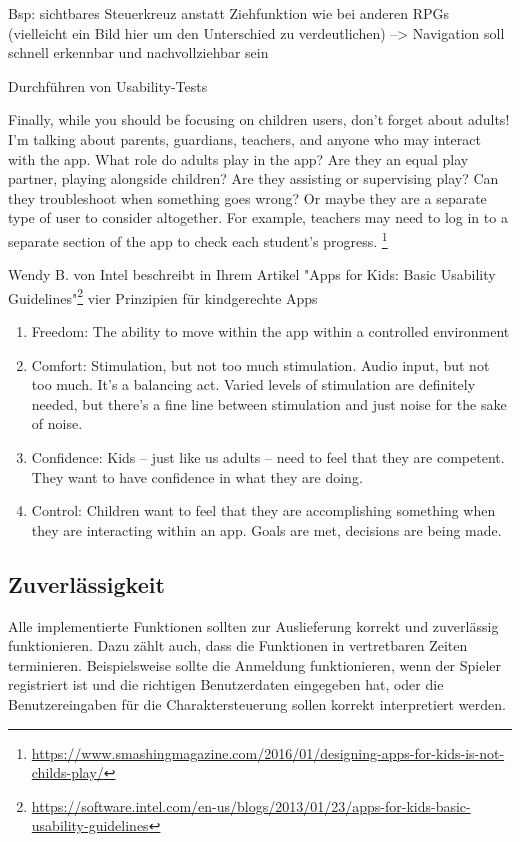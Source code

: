 {		Bsp: sichtbares Steuerkreuz anstatt Ziehfunktion wie bei anderen RPGs (vielleicht ein Bild hier um den Unterschied zu verdeutlichen)
		--> Navigation soll schnell erkennbar und nachvollziehbar sein
		
		Durchführen von Usability-Tests
		
		Finally, while you should be focusing on children users, don’t forget about adults! I’m talking about parents, guardians, teachers, and anyone who may interact with the app. What role do adults play in the app? Are they an equal play partner, playing alongside children? Are they assisting or supervising play? Can they troubleshoot when something goes wrong? Or maybe they are a separate type of user to consider altogether. For example, teachers may need to log in to a separate section of the app to check each student’s progress. \footnote{\url{https://www.smashingmagazine.com/2016/01/designing-apps-for-kids-is-not-childs-play/}}
		
		Wendy B. von Intel beschreibt in Ihrem Artikel "Apps for Kids: Basic Usability Guidelines"\footnote{\url{https://software.intel.com/en-us/blogs/2013/01/23/apps-for-kids-basic-usability-guidelines}} vier Prinzipien für kindgerechte Apps
		\begin{enumerate}
			\item{Freedom: The ability to move within the app within a controlled environment}
			\item{Comfort: Stimulation, but not too much stimulation. Audio input, but not too much. It’s a balancing act. Varied levels of stimulation are definitely needed, but there’s a fine line between stimulation and just noise for the sake of noise.}
			\item{Confidence: Kids – just like us adults – need to feel that they are competent. They want to have confidence in what they are doing.}
			\item{Control: Children want to feel that they are accomplishing something when they are interacting within an app. Goals are met, decisions are being made.}
		\end{enumerate}

	\subsection{Zuverlässigkeit}
		Alle implementierte Funktionen sollten zur Auslieferung korrekt und zuverlässig funktionieren. Dazu zählt auch, dass die Funktionen in vertretbaren Zeiten terminieren. Beispielsweise sollte die Anmeldung funktionieren, wenn der Spieler registriert ist und die richtigen Benutzerdaten eingegeben hat, oder die Benutzereingaben für die Charaktersteuerung sollen korrekt interpretiert werden.
		
}
